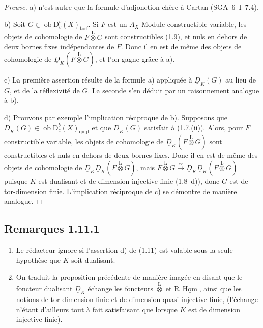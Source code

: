 \documentclass[11pt]{article}
\DeclareMathOperator{\Hom}{Hom}
\newcommand{\R}{\mathrm{R}}
\newcommand{\D}{\mathrm{D}}
\newcommand{\ob}{\operatorname{ob}}
\providecommand{\Hom}{\operatorname{Hom}}
\providecommand{\ob}{\operatorname{ob}}
\providecommand{\R}{\mathrm R}
\providecommand{\Hom}{\operatorname{Hom}}
\begin{document}
\begin{proof}[Preuve]
a) n'est autre que la formule d'adjonction chère à Cartan (SGA~6~I~7.4).

b) Soit $G \in \ob \D_c^{b}(X)_{\mathrm{torf}}$. Si $F$ est un $A_X$-Module constructible variable, les objets de cohomologie de $F \mathop{\otimes}\limits^{\mathrm{L}} G$ sont constructibles (1.9), et nuls en dehors de deux bornes fixes indépendantes de $F$. Donc il en est de même des objets de cohomologie de $\underline{D}_K(F \mathop{\otimes}\limits^{\mathrm{L}} G)$, et l'on gagne grâce à a).

c) La première assertion résulte de la formule a) appliquée à $\underline{D}_K(G)$ au lieu de $G$, et de la réflexivité de $G$. La seconde s'en déduit par un raisonnement analogue à b).

d) Prouvons par exemple l'implication réciproque de b). Supposons que $\underline{D}_K(G) \in \ob \D_c^{b}(X)_{\mathrm{qinjf}}$ et que $\underline{D}_K(G)$ satisfait à (1.7.(ii)). Alors, pour $F$ constructible variable, les objets de cohomologie de $\underline{D}_K(F \mathop{\otimes}\limits^{\mathrm{L}} G)$ sont constructibles et nuls en dehors de deux bornes fixes. Donc il en est de même des objets de cohomologie de $\underline{D}_K \underline{D}_K(F \mathop{\otimes}\limits^{\mathrm{L}} G)$, mais $F \mathop{\otimes}\limits^{\mathrm{L}} G \xrightarrow{\sim} \underline{D}_K \underline{D}_K(F \mathop{\otimes}\limits^{\mathrm{L}} G)$ puisque $K$ est dualisant et de dimension injective finie (1.8~d)), donc $G$ est de tor-dimension finie. L'implication réciproque de c) se démontre de manière analogue.
\end{proof}

\subsection*{Remarques 1.11.1}
\begin{enumerate}
\item[a)] Le rédacteur ignore si l'assertion d) de (1.11) est valable sous la seule hypothèse que $K$ soit dualisant.
\item[b)] On traduit la proposition précédente de manière imagée en disant que le foncteur dualisant $\underline{D}_K$ échange les foncteurs $\mathop{\otimes}\limits^{\mathrm{L}}$ et $\R\,\underline{\Hom}$, ainsi que les notions de tor-dimension finie et de dimension quasi-injective finie, (l'échange n'étant d'ailleurs tout à fait satisfaisant que lorsque $K$ est de dimension injective finie).
\end{enumerate}
\end{document}
